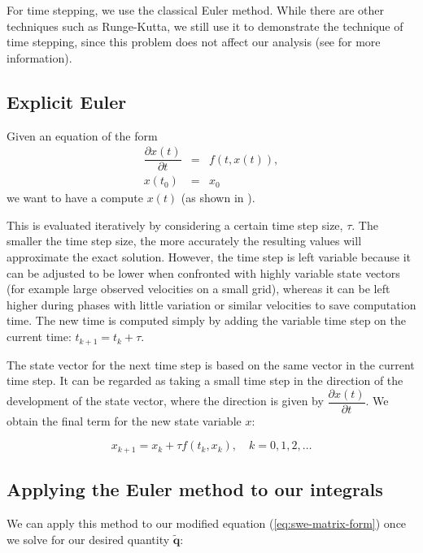 \documentclass[a4paper, twoside]{article}
\newcommand{\pd}[2]{\dfrac{\partial #1}{\partial #2}}
\begin{document}
For time stepping, we use the classical Euler method. While there are other techniques such as Runge-Kutta, we still use it to demonstrate the technique of time stepping, since this problem does not affect our analysis (see \cite{hans2009schwarz} for more information).

\subsection{Explicit Euler}
\label{subsec:explicit-euler}

Given an equation of the form
\begin{eqnarray}
  \label{eq:euler-method-setting}
  \pd{x(t)}{t} & = & f(t, x(t)), \\
  x(t_0) & = & x_0
\end{eqnarray}
we want to have a compute $x(t)$ (as shown in \cite{schwaiger08adaptive}).

This is evaluated iteratively by considering a certain time step size, $\tau$. The smaller the time step size, the more accurately the resulting values will approximate the exact solution. However, the time step is left variable because it can be adjusted to be lower when confronted with highly variable state vectors (for example large observed velocities on a small grid), whereas it can be left higher during phases with little variation or similar velocities to save computation time. The new time is computed simply by adding the variable time step on the current time: $t_{k+1} = t_k + \tau$.

The state vector for the next time step is based on the same vector in the current time step. It can be regarded as taking a small time step in the direction of the development of the state vector, where the direction is given by $\pd{x(t)}{t}$. We obtain the final term for the new state variable $x$:

\begin{equation}
  \label{eq:euler-step-solution}
  x_{k+1} = x_k + \tau f(t_k, x_k), \quad k=0,1,2,\dots
\end{equation}

\subsection{Applying the Euler method to our integrals}
\label{subsec:euler-method-applied}

We can apply this method to our modified equation (\ref{eq:swe-matrix-form}) once we solve for our desired quantity $\tilde{\mathbf{q}}$:
\end{document}
